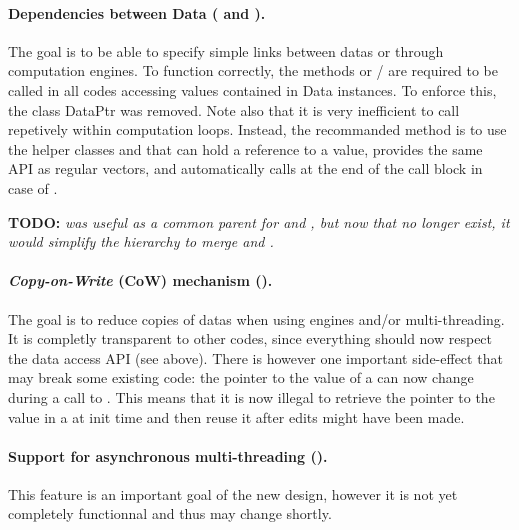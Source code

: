 \paragraph{Dependencies between Data ( and ).}
The goal is to be able to specify simple links between datas or through computation engines.
To function correctly, the methods  or / are required to be called in all codes accessing values contained in Data instances.
To enforce this, the class DataPtr was removed.
Note also that it is very inefficient to call  repetively within computation loops.
Instead, the recommanded method is to use the helper classes  and 
that can hold a reference to a  value, provides the same API as regular vectors,
and automatically calls  at the end of the call block in case of .

\textbf{TODO:} \textit{ was useful as a common parent for  and , but now that  no longer exist, it would simplify the hierarchy to merge  and .}

\paragraph{\textit{Copy-on-Write} (CoW) mechanism ().}
The goal is to reduce copies of datas when using engines and/or multi-threading.
It is completly transparent to other codes, since everything should now respect the data access API (see above).
There is however one important side-effect that may break some existing code: the pointer to the value of a  can now change during a call to .
This means that it is now illegal to retrieve the pointer to the value in a  at init time and then reuse it after edits might have been made.

\paragraph{Support for asynchronous multi-threading ().}
This feature is an important goal of the new design, however it is not yet completely functionnal and thus may change shortly.


